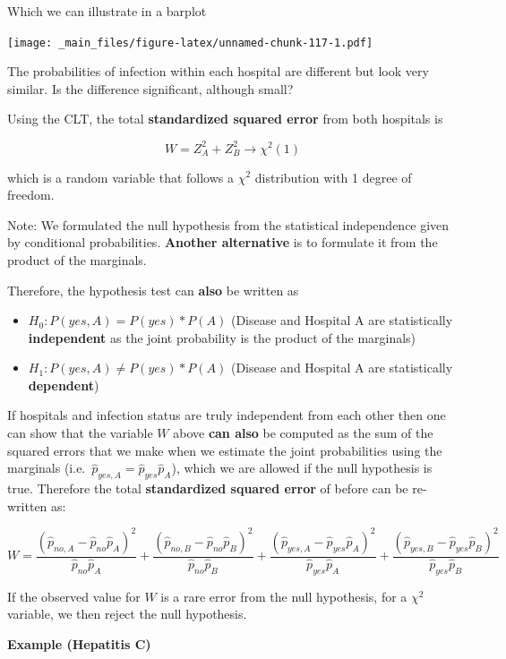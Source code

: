 \documentclass[
]{book}
\providecommand{\tightlist}{%
  \setlength{\itemsep}{0pt}\setlength{\parskip}{0pt}}
\begin{document}
Which we can illustrate in a barplot

\texttt{[image: \_main\_files/figure-latex/unnamed-chunk-117-1.pdf]}

The probabilities of infection within each hospital are different but look very similar. Is the difference significant, although small?

Using the CLT, the total \textbf{standardized squared error} from both hospitals is

\[W= Z_A^2+Z_B^2\rightarrow \chi^2(1)\]

which is a random variable that follows a \(\chi^2\) distribution with 1 degree of freedom.

Note: We formulated the null hypothesis from the statistical independence given by conditional probabilities. \textbf{Another alternative} is to formulate it from the product of the marginals.

Therefore, the hypothesis test can \textbf{also} be written as

\begin{itemize}
\tightlist
\item
  \(H_0:P(yes, A)=P(yes)*P(A)\) (Disease and Hospital A are statistically \textbf{independent} as the joint probability is the product of the marginals)
\item
  \(H_1:P(yes, A)\neq P(yes)*P(A)\)
  (Disease and Hospital A are statistically \textbf{dependent})
\end{itemize}

If hospitals and infection status are truly independent from each other then one can show that the variable \(W\) above \textbf{can also} be computed as the sum of the squared errors that we make when we estimate the joint probabilities using the marginals (i.e.~\(\hat{p}_{yes,A}=\hat{p}_{yes}\hat{p}_A\)), which we are allowed if the null hypothesis is true. Therefore the total \textbf{standardized squared error} of before can be re-written as:

\[W= \frac{(\hat{p}_{no,A}-\hat{p}_{no}\hat{p}_{A})^2}{\hat{p}_{no}\hat{p}_{A}}+\frac{(\hat{p}_{no,B}-\hat{p}_{no}\hat{p}_{B})^2}{\hat{p}_{no}\hat{p}_{B}}+\frac{(\hat{p}_{yes,A}-\hat{p}_{yes}\hat{p}_{A})^2}{\hat{p}_{yes}\hat{p}_{A}}+\frac{(\hat{p}_{yes,B}-\hat{p}_{yes}\hat{p}_{B})^2}{\hat{p}_{yes}\hat{p}_{B}}\]

If the observed value for \(W\) is a rare error from the null hypothesis, for a \(\chi^2\) variable, we then reject the null hypothesis.

\textbf{Example (Hepatitis C)}
\end{document}

